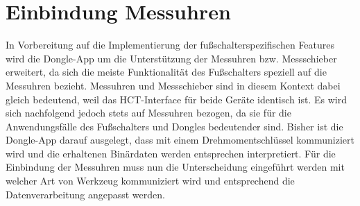 \section{Einbindung Messuhren}
In Vorbereitung auf die Implementierung der fußschalterspezifischen Features wird die Dongle-App um die Unterstützung der Messuhren bzw. Messschieber erweitert, da sich die meiste Funktionalität des Fußschalters speziell auf die Messuhren bezieht. Messuhren und Messschieber sind in diesem Kontext dabei gleich bedeutend, weil das \ac{HCT}-Interface für beide Geräte identisch ist. Es wird sich nachfolgend jedoch stets auf Messuhren bezogen, da sie für die Anwendungsfälle des Fußschalters und Dongles bedeutender sind. Bisher ist die Dongle-App darauf ausgelegt, dass mit einem Drehmomentschlüssel kommuniziert wird und die erhaltenen Binärdaten werden entsprechen interpretiert. Für die Einbindung der Messuhren muss nun die Unterscheidung eingeführt werden mit welcher Art von Werkzeug kommuniziert wird und entsprechend die Datenverarbeitung angepasst werden.

